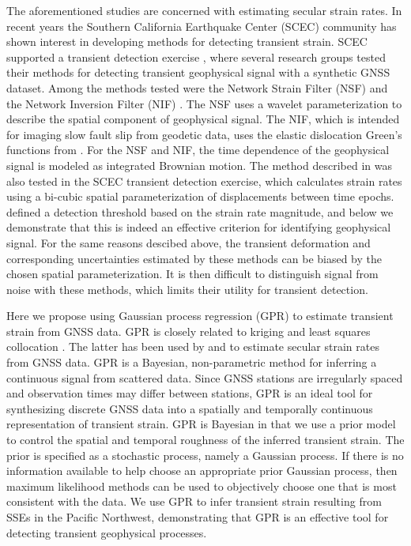 \documentclass[extra,mreferee]{gji}
\begin{document}
The aforementioned studies are concerned with estimating secular
strain rates. In recent years the Southern California Earthquake
Center (SCEC) community has shown interest in developing methods for
detecting transient strain. SCEC supported a transient detection
exercise \citep{Lohman2013}, where several research groups tested
their methods for detecting transient geophysical signal with a
synthetic GNSS dataset. Among the methods tested were the Network
Strain Filter (NSF) \citep{Ohtani2010} and the Network Inversion
Filter (NIF) \citep{Segall1997}. The NSF uses a wavelet
parameterization to describe the spatial component of geophysical
signal. The NIF, which is intended for imaging slow fault slip from
geodetic data, uses the elastic dislocation Green's functions from
\citet{Okada1992}. For the NSF and NIF, the time dependence of the
geophysical signal is modeled as integrated Brownian motion. The
method described in \citet{Holt2013} was also tested in the SCEC
transient detection exercise, which calculates strain rates using a
bi-cubic spatial parameterization of displacements between time
epochs. \citet{Holt2013} defined a detection threshold based on the
strain rate magnitude, and below we demonstrate that this is indeed an
effective criterion for identifying geophysical signal. For the same
reasons descibed above, the transient deformation and corresponding
uncertainties estimated by these methods can be biased by the chosen
spatial parameterization. It is then difficult to distinguish signal
from noise with these methods, which limits their utility for
transient detection.


Here we propose using Gaussian process regression (GPR)
\citep{Rasmussen2006} to estimate transient strain from GNSS data. GPR
is closely related to kriging \citep{Cressie1992} and least squares
collocation \citep{Moritz1978}. The latter has been used by
\citet{Kato1998} and \citet{El-Fiky1999} to estimate secular strain
rates from GNSS data. GPR is a Bayesian, non-parametric method for
inferring a continuous signal from scattered data. Since GNSS stations
are irregularly spaced and observation times may differ between
stations, GPR is an ideal tool for synthesizing discrete GNSS data
into a spatially and temporally continuous representation of transient
strain. GPR is Bayesian in that we use a prior model to control the
spatial and temporal roughness of the inferred transient strain. The
prior is specified as a stochastic process, namely a Gaussian process.
If there is no information available to help choose an appropriate
prior Gaussian process, then maximum likelihood methods can be used to
objectively choose one that is most consistent with the data. We use
GPR to infer transient strain resulting from SSEs in the Pacific
Northwest, demonstrating that GPR is an effective tool for detecting
transient geophysical processes.
\end{document}
